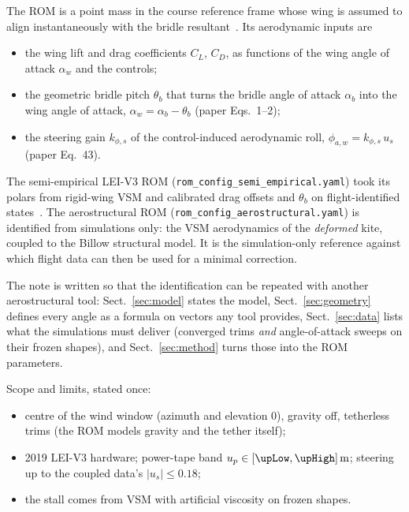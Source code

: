 \documentclass[11pt,a4paper]{article}
\newcommand{\code}[1]{\texttt{\small #1}}
\begin{document}
The ROM is a point mass in the course reference frame whose wing is assumed to
align instantaneously with the bridle resultant~\cite{cayon2026rom}. Its
aerodynamic inputs are
\begin{itemize}
  \item the wing lift and drag coefficients $C_L$, $C_D$, as functions of the
        wing angle of attack $\alpha_w$ and the controls;
  \item the geometric bridle pitch $\theta_b$ that turns the bridle angle of
        attack $\alpha_b$ into the wing angle of attack,
        $\alpha_w=\alpha_b-\theta_b$ (paper Eqs.~1--2);
  \item the steering gain $k_{\phi,s}$ of the control-induced aerodynamic roll,
        $\phi_{a,w}=k_{\phi,s}\,u_s$ (paper Eq.~43).
\end{itemize}
The semi-empirical LEI-V3 ROM (\code{rom\_config\_semi\_empirical.yaml}) took
its polars from rigid-wing VSM and calibrated drag offsets and $\theta_b$ on
flight-identified states~\cite[Sect.~5.1]{cayon2026rom}. The aerostructural ROM
(\code{rom\_config\_aerostructural.yaml}) is identified from simulations only:
the VSM aerodynamics of the \emph{deformed} kite, coupled to the Billow
structural model. It is the simulation-only reference against which flight
data can then be used for a minimal correction.

The note is written so that the identification can be repeated with another
aerostructural tool: Sect.~\ref{sec:model} states the model,
Sect.~\ref{sec:geometry} defines every angle as a formula on vectors any
tool provides, Sect.~\ref{sec:data} lists what the simulations must deliver
(converged trims \emph{and} angle-of-attack sweeps on their frozen shapes),
and Sect.~\ref{sec:method} turns those into the ROM parameters.

Scope and limits, stated once:
\begin{itemize}
  \item centre of the wind window (azimuth and elevation $0$), gravity off,
        tetherless trims (the ROM models gravity and the tether itself);
  \item 2019 LEI-V3 hardware; power-tape band
        $u_p\in[\upLow,\upHigh]\,\si{\metre}$; steering up to the coupled
        data's $|u_s|\le0.18$;
  \item the stall comes from VSM with artificial viscosity on frozen shapes.
\end{itemize}

\end{document}
